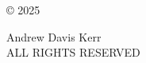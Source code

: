 \begin{center}
\thispagestyle{empty}
\vspace*{7in}

© 2025

Andrew Davis Kerr \\
ALL RIGHTS RESERVED

\end{center}
\clearpage